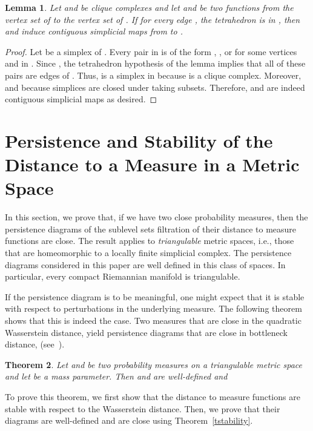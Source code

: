 \documentclass[a4paper]{article}
\newtheorem{theorem}{Theorem}[section]
\newtheorem{lemma}[theorem]{Lemma}
\begin{document}
\begin{lemma}\label{lem:contiguity_and_cliques}
Let  and  be clique complexes and let  and  be two functions from the vertex set of  to the vertex set of .
If for every edge , the tetrahedron  is in , then  and  induce contiguous simplicial maps from  to .
\end{lemma}

\begin{proof}
  Let  be a simplex of .
  Every pair in  is of the form , , or  for some vertices  and  in .
  Since , the tetrahedron hypothesis of the lemma implies that all of these pairs are edges of .
  Thus,  is a simplex in  because  is a clique complex.
  Moreover,  and  because simplices are closed under taking subsets.
  Therefore,  and  are indeed contiguous simplicial maps as desired.
\end{proof}



\section{Persistence and Stability of the Distance to a Measure in a Metric Space} \label{sPersStabDtm}

In this section, we prove that, if we have two close probability measures, then the persistence diagrams of the sublevel sets filtration of their distance to measure functions are close.
The result applies to \emph{triangulable} metric spaces, i.e., those that are homeomorphic to a locally finite simplicial complex.
The persistence diagrams considered in this paper are well defined in this class of spaces.
In particular, every compact Riemannian manifold is triangulable.

  If the persistence diagram is to be meaningful, one might expect that it is stable with respect to perturbations in the underlying measure.
  The following theorem shows that this is indeed the case.
  Two measures that are close in the quadratic Wasserstein distance,  yield persistence diagrams that are close in bottleneck distance,  (see~\cite[Sec. 7.1]{villani2003tot}).

\begin{theorem}\label{tStabPersDtm}
Let  and  be two probability measures on a triangulable metric space  and let  be a mass parameter. 
Then  and  are well-defined and

\end{theorem}

To prove this theorem, we first show that the distance to measure functions are stable with respect to the Wasserstein distance.
Then, we prove that their diagrams are well-defined and are close using Theorem~\ref{tstability}.
\end{document}
